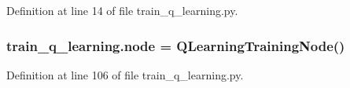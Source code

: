 Definition at line 14 of file train\+\_\+q\+\_\+learning.\+py.

\subsubsection[{\texorpdfstring{node}{node}}]{\setlength{\rightskip}{0pt plus 5cm}train\+\_\+q\+\_\+learning.\+node = {\bf Q\+Learning\+Training\+Node}()}\hypertarget{namespacetrain__q__learning_aa58fc19cc7547830f79297cb1755de19}{}\label{namespacetrain__q__learning_aa58fc19cc7547830f79297cb1755de19}


Definition at line 106 of file train\+\_\+q\+\_\+learning.\+py.

